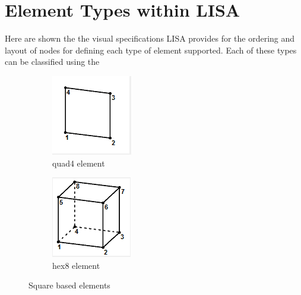 \appendix

\section{Element Types within LISA}
Here are shown the the visual specifications LISA provides for the ordering and layout of nodes for defining each type of element supported. Each of these types can be classified using the 




\begin{figure}[!h]
\centering
\begin{subfigure}{.5\textwidth}
  \centering
  \includegraphics[width=0.3\linewidth]{../Graphics/LISA-quad4.png}
  \caption{quad4 element}
  \label{fig:sub1}
\end{subfigure}%
\begin{subfigure}{.5\textwidth}
  \centering
  \includegraphics[width=0.3\linewidth]{../Graphics/LISA-hex8.png}
  \caption{hex8 element}
  \label{fig:sub2}
\end{subfigure}
\label{fig:test}
\caption{Square based elements}
\end{figure}


